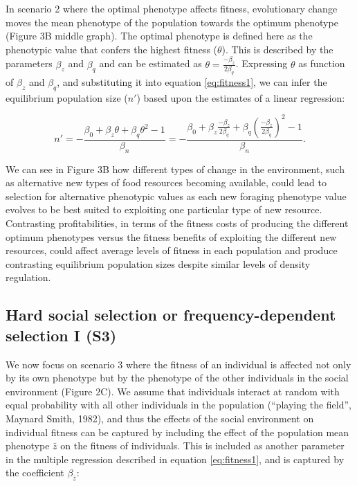 \documentclass{article}
\begin{document}
In scenario 2 where the optimal phenotype affects fitness, evolutionary change moves the mean phenotype of the population towards the optimum phenotype (Figure 3B middle graph). The optimal phenotype is defined here as the phenotypic value that confers the highest fitness ($\theta$). This is described by the parameters $\beta_{z}$ and $\beta_{q}$ and can be estimated as $\theta=\frac{-\beta_{z}}{2\beta_{q}}$. Expressing $\theta$ as function of $\beta_{z}$ and $\beta_{q}$, and substituting it into equation \ref{eq:fitness1}, we can infer the equilibrium population size ($n'$) based upon the estimates of a linear regression:

\begin{equation}\label{eq:equilibrium1}
n'=-\frac{\beta_{0}+ \beta_{z}\theta + \beta_{q}\theta^2-1}{\beta_n} = -\frac{\beta_{0}+ \beta_{z}\frac{-\beta_{z}}{2\beta_{q}} + \beta_{q}(\frac{-\beta_{z}}{2\beta_{q}})^2-1}{\beta_n}. 
\end{equation}

We can see in Figure 3B how different types of change in the environment, such as alternative new types of food resources becoming available, could lead to selection for alternative phenotypic values as each new foraging phenotype value evolves to be best suited to exploiting one particular type of new resource. Contrasting profitabilities, in terms of the fitness costs of producing the different optimum phenotypes versus the fitness benefits of exploiting the different new resources, could affect average levels of fitness in each population and produce contrasting equilibrium population sizes despite similar levels of density regulation. 

\subsection{Hard social selection or frequency-dependent selection I (S3)}

We now focus on scenario 3 where the fitness of an individual is affected not only by its own phenotype but by the phenotype of the other individuals in the social environment (Figure 2C). We assume that individuals interact at random with equal probability with all other individuals in the population (“playing the field”, Maynard Smith, 1982), and thus the effects of the social environment on individual fitness can be captured by including the effect of the population mean phenotype $\bar{z}$ on the fitness of individuals. This is included as another parameter in the multiple regression described in equation \ref{eq:fitness1}, and is captured by the coefficient $\beta_{\bar{z}}$:  
\end{document}
